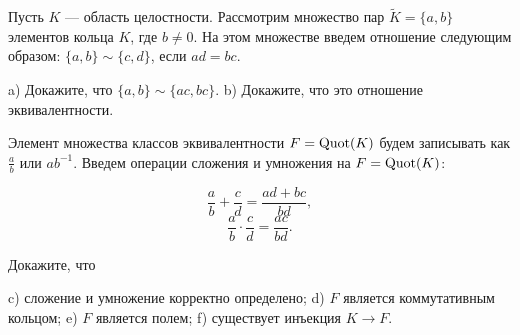 \begin{problem}[23(5.1, 5.2)]
Пусть $K$ --- область целостности. Рассмотрим  множество пар $\tilde{K}=\{a,b\}$ элементов кольца $K$, где $b\neq 0$. На этом множестве введем отношение следующим образом: $\{a,b\} \sim \{c,d\}$, если $ad=bc$.

a) Докажите, что $\{a,b\} \sim \{ac,bc\}$. 
b) Докажите, что это отношение эквивалентности.

Элемент множества классов эквивалентности $F = \operatorname{Quot}(K)$ будем записывать как $\frac{a}{b}$ или $ab^{-1}$. Введем операции сложения и умножения на $F = \operatorname{Quot}(K)$:

$$\frac{a}{b} + \frac{c}{d} = \frac{ad+bc}{bd},$$
$$\frac{a}{b} \cdot \frac{c}{d} = \frac{ac}{bd}.$$

Докажите, что

c) сложение и умножение корректно определено;
d) $F$ является коммутативным кольцом;
e) $F$ является полем;
f) существует инъекция $K \to F$.

\end{problem}

